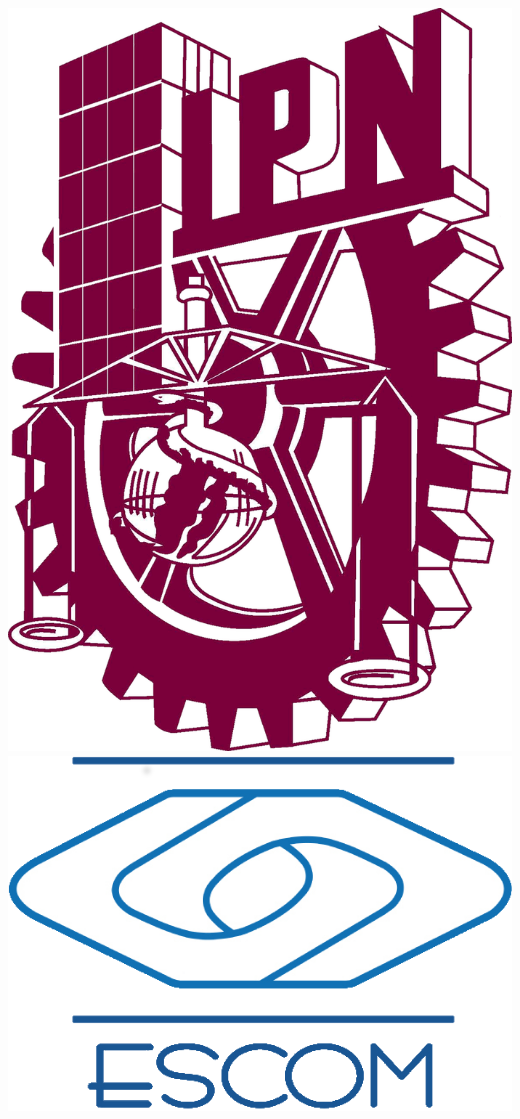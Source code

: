 \thispagestyle{empty}
\begin{center}  
  \includegraphics[height=0.2\textheight]{./image/title-page/IPN.png}
  \hspace*{0.5\textwidth}
	\includegraphics[height=0.2\textheight]{./image/title-page/ESCOM.png}
	

\end{center}
